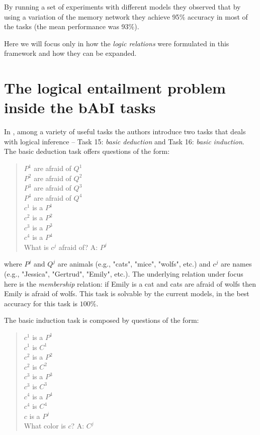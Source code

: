By running a set of experiments with different models they observed that by using a variation of the memory network they achieve 95$\%$ accuracy in most of the tasks (the mean performance was 93$\%$).

Here we will focus only in how the \textit{logic relations} were formulated in this framework and how they can be expanded.

\section{The logical entailment problem inside the bAbI tasks}
\label{ch:03-tasks}


In \cite{WestonBCM15}, among a variety of useful tasks the authors introduce two tasks that deals with logical inference -- Task 15: \textit{basic deduction} and Task 16: \textit{basic induction}. The basic deduction task offers questions of the form:

\begin{quote} 
\centering 
$P^{1}$ are afraid of $Q^{1}$\\
$P^{2}$ are afraid of $Q^{2}$\\
$P^{3}$ are afraid of $Q^{3}$\\
$P^{4}$ are afraid of $Q^{4}$\\
$c^{1}$ is a $P^{1}$\\
$c^{2}$ is a $P^{2}$\\
$c^{3}$ is a $P^{3}$\\
$c^{4}$ is a $P^{4}$\\
What is $c^j$ afraid of? A: $P^{j}$\\
\end{quote}

where $P^j$ and $Q^j$ are animals (e.g., "cats", "mice", "wolfs", etc.) and $c^j$ are names (e.g., "Jessica", "Gertrud", "Emily", etc.). The underlying relation under focus here is the \textit{membership} relation: if Emily is a cat and cats are afraid of wolfs then Emily is afraid of wolfs. This task is solvable by the current models, in \cite{WestonBCM15} the best accuracy for this task is $100\%$. 

The basic induction task is composed by questions of the form:

\begin{quote} 
\centering 
$c^{1}$ is a $P^{1}$\\
$c^{1}$ is $C^{1}$\\
$c^{2}$ is a $P^{2}$\\
$c^{2}$ is $C^{2}$\\
$c^{3}$ is a $P^{3}$\\
$c^{3}$ is $C^{3}$\\
$c^{4}$ is a $P^{4}$\\
$c^{4}$ is $C^{4}$\\
$c$ is a $P^{j}$\\
What color is $c$? A: $C^{j}$\\
\end{quote}

